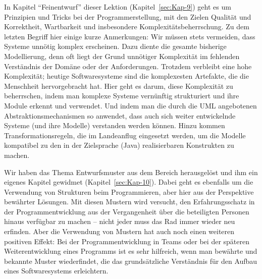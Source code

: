 In Kapitel "`Feinentwurf"' dieser Lektion (Kapitel~\ref{sec:Kap-9}) geht es um Prinzipien und Tricks bei der Programmerstellung, mit den Zielen Qualität und Korrektheit, Wartbarkeit und insbesondere Komplexitätsbeherrschung. Zu dem letzten Begriff hier einige kurze Anmerkungen: Wir müssen stets vermeiden, dass Systeme unnötig komplex erscheinen. Dazu diente die gesamte bisherige Modellierung, denn oft liegt der Grund unnötiger Komplexität im fehlenden Verständnis der Domäne oder der Anforderungen. Trotzdem verbleibt eine hohe Komplexität; heutige Softwaresysteme sind die komplexesten Artefakte, die die Menschheit hervorgebracht hat. Hier geht es da\-rum, diese Komplexität zu beherrschen, indem man komplexe Systeme vernünftig strukturiert und ihre Module erkennt und verwendet. Und indem man die durch die UML angebotenen Abstraktionsmechanismen so anwendet, dass auch sich weiter entwickelnde Systeme (und ihre Modelle) verstanden werden können. Hinzu kommen Transformationsregeln, die im Landeanflug eingesetzt werden, um die Modelle kompatibel zu den in der Zielsprache (Java) realisierbaren Konstrukten zu machen.

Wir haben das Thema Entwurfsmuster aus dem Bereich herausgelöst und ihm ein eigenes Kapitel gewidmet (Kapitel~\ref{sec:Kap-10}). Dabei geht es ebenfalls um die Verwendung von Strukturen beim Programmieren, aber hier aus der Perspektive bewährter \mbox{Lösungen}. Mit diesen Mustern wird versucht, den Erfahrungsschatz in der Programm\-entwicklung aus der Vergangenheit über die beteiligten Personen hinaus verfügbar zu machen -- nicht jeder muss das Rad immer wieder neu erfinden. Aber die Verwendung von Mustern hat auch noch einen weiteren positiven Effekt: Bei der Programm\-entwicklung in Teams oder bei der späteren Weiterentwicklung eines Programms ist es sehr hilfreich, wenn man bewährte und bekannte Muster wiederfindet, die das grundsätzliche Verständnis für den Aufbau eines Softwaresystems erleichtern. 

